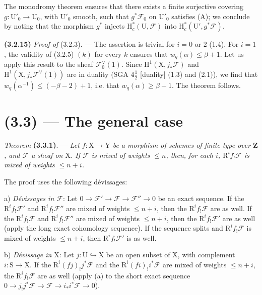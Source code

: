 \documentclass[11pt,leqno]{article}
\begin{document}
The monodromy theorem ensures that there exists a finite surjective covering \(g:\mathrm{U}'_0\to\mathrm{U}_0\), with \(\mathrm{U}'_0\) smooth, such that \(g^*\mathscr{F}_0\) on \(\mathrm{U}'_0\) satisfies (A); we conclude by noting that the morphism \(g^*\) injects \(\mathrm{H}_c^*(\mathrm{U},\mathscr{F})\) into \(\mathrm{H}_c^*(\mathrm{U}',g^*\mathscr{F})\).

\textbf{(3.2.15)} \textit{Proof of} (3.2.3). — The assertion is trivial for \(i=0\) or \(2\) (1.4). For \(i=1\), the validity of (3.2.5) \((k)\) for every \(k\) ensures that \(w_q(\alpha)\leq\beta+1\). Let us apply this result to the sheaf \(\mathscr{F}_0^\vee(1)\). Since \(\mathrm{H}^1(\mathrm{X},j_*\mathscr{F})\) and \(\mathrm{H}^1(\mathrm{X},j_*\mathscr{F}^\vee(1))\) are in duality (SGA \(4\frac{1}{2}\) [duality] (1.3) and (2.1)), we find that \(w_q(\alpha^{-1})\leq(-\beta-2)+1\), i.e. that \(w_q(\alpha)\geq\beta+1\). The theorem follows.

\section*{(3.3) — The general case}

\textit{Theorem} \textbf{(3.3.1)}. — \textit{Let \(f:\mathrm{X}\to\mathrm{Y}\) be a morphism of schemes of finite type over \(\mathbf{Z}\), and \(\mathscr{F}\) a sheaf on \(\mathrm{X}\). If \(\mathscr{F}\) is mixed of weights \(\leq n\), then, for each \(i\), \(\mathrm{R}^if_!\mathscr{F}\) is mixed of weights \(\leq n+i\).}

The proof uses the following dévissages:

a) \textit{Dévissages in \(\mathscr{F}\)}: Let \(0\to\mathscr{F}'\to\mathscr{F}\to\mathscr{F}''\to0\) be an exact sequence. If the \(\mathrm{R}^if_!\mathscr{F}'\) and \(\mathrm{R}^if_!\mathscr{F}''\) are mixed of weights \(\leq n+i\), then the \(\mathrm{R}^if_!\mathscr{F}\) are as well. If the \(\mathrm{R}^if_!\mathscr{F}\) and \(\mathrm{R}^if_!\mathscr{F}''\) are mixed of weights \(\leq n+i\), then the \(\mathrm{R}^if_!\mathscr{F}'\) are as well (apply the long exact cohomology sequence). If the sequence splits and \(\mathrm{R}^if_!\mathscr{F}\) is mixed of weights \(\leq n+i\), then \(\mathrm{R}^if_!\mathscr{F}'\) is as well.

b) \textit{Dévissage in \(\mathrm{X}\)}: Let \(j:\mathrm{U}\hookrightarrow\mathrm{X}\) be an open subset of \(\mathrm{X}\), with complement \(i:\mathrm{S}\to\mathrm{X}\). If the \(\mathrm{R}^i(fj)_!j^*\mathscr{F}\) and the \(\mathrm{R}^i(fi)_!i^*\mathscr{F}\) are mixed of weights \(\leq n+i\), the \(\mathrm{R}^if_!\mathscr{F}\) are as well (apply (a) to the short exact sequence \(0\to j_!j^*\mathscr{F}\to\mathscr{F}\to i_*i^*\mathscr{F}\to0\)).
\end{document}
